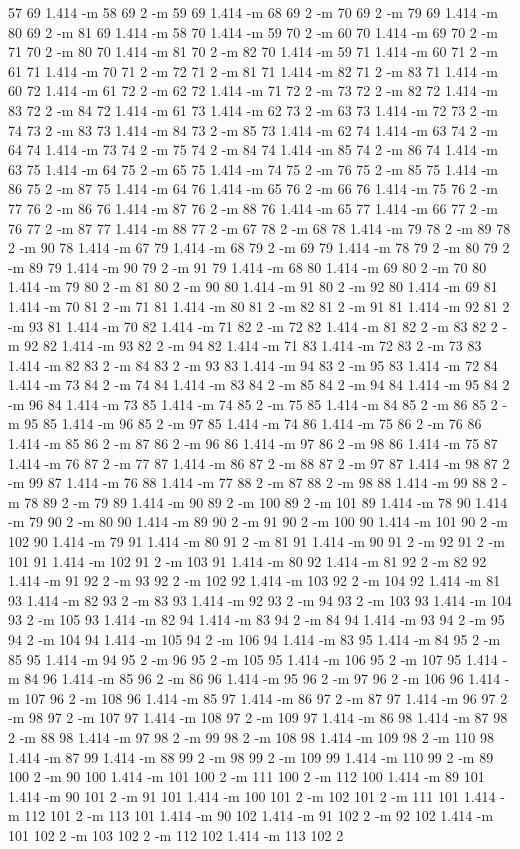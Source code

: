 \documentclass[12pt]{article}
\begin{document}
57 69 1.414 -m 58 69 2 -m 59 69 1.414 -m 68 69 2 -m 70 69 2 -m 79 69 1.414 -m 80 69 2 -m 81 69 1.414 -m 58 70 1.414 -m 59 70 2 -m 60 70 1.414 -m 69 70 2 -m 71 70 2 -m 80 70 1.414 -m 81 70 2 -m 82 70 1.414 -m 59 71 1.414 -m 60 71 2 -m 61 71 1.414 -m 70 71 2 -m 72 71 2 -m 81 71 1.414 -m 82 71 2 -m 83 71 1.414 -m 60 72 1.414 -m 61 72 2 -m 62 72 1.414 -m 71 72 2 -m 73 72 2 -m 82 72 1.414 -m 83 72 2 -m 84 72 1.414 -m 61 73 1.414 -m 62 73 2 -m 63 73 1.414 -m 72 73 2 -m 74 73 2 -m 83 73 1.414 -m 84 73 2 -m 85 73 1.414 -m 62 74 1.414 -m 63 74 2 -m 64 74 1.414 -m 73 74 2 -m 75 74 2 -m 84 74 1.414 -m 85 74 2 -m 86 74 1.414 -m 63 75 1.414 -m 64 75 2 -m 65 75 1.414 -m 74 75 2 -m 76 75 2 -m 85 75 1.414 -m 86 75 2 -m 87 75 1.414 -m 64 76 1.414 -m 65 76 2 -m 66 76 1.414 -m 75 76 2 -m 77 76 2 -m 86 76 1.414 -m 87 76 2 -m 88 76 1.414 -m 65 77 1.414 -m 66 77 2 -m 76 77 2 -m 87 77 1.414 -m 88 77 2 -m 67 78 2 -m 68 78 1.414 -m 79 78 2 -m 89 78 2 -m 90 78 1.414 -m 67 79 1.414 -m 68 79 2 -m 69 79 1.414 -m 78 79 2 -m 80 79 2 -m 89 79 1.414 -m 90 79 2 -m 91 79 1.414 -m 68 80 1.414 -m 69 80 2 -m 70 80 1.414 -m 79 80 2 -m 81 80 2 -m 90 80 1.414 -m 91 80 2 -m 92 80 1.414 -m 69 81 1.414 -m 70 81 2 -m 71 81 1.414 -m 80 81 2 -m 82 81 2 -m 91 81 1.414 -m 92 81 2 -m 93 81 1.414 -m 70 82 1.414 -m 71 82 2 -m 72 82 1.414 -m 81 82 2 -m 83 82 2 -m 92 82 1.414 -m 93 82 2 -m 94 82 1.414 -m 71 83 1.414 -m 72 83 2 -m 73 83 1.414 -m 82 83 2 -m 84 83 2 -m 93 83 1.414 -m 94 83 2 -m 95 83 1.414 -m 72 84 1.414 -m 73 84 2 -m 74 84 1.414 -m 83 84 2 -m 85 84 2 -m 94 84 1.414 -m 95 84 2 -m 96 84 1.414 -m 73 85 1.414 -m 74 85 2 -m 75 85 1.414 -m 84 85 2 -m 86 85 2 -m 95 85 1.414 -m 96 85 2 -m 97 85 1.414 -m 74 86 1.414 -m 75 86 2 -m 76 86 1.414 -m 85 86 2 -m 87 86 2 -m 96 86 1.414 -m 97 86 2 -m 98 86 1.414 -m 75 87 1.414 -m 76 87 2 -m 77 87 1.414 -m 86 87 2 -m 88 87 2 -m 97 87 1.414 -m 98 87 2 -m 99 87 1.414 -m 76 88 1.414 -m 77 88 2 -m 87 88 2 -m 98 88 1.414 -m 99 88 2 -m 78 89 2 -m 79 89 1.414 -m 90 89 2 -m 100 89 2 -m 101 89 1.414 -m 78 90 1.414 -m 79 90 2 -m 80 90 1.414 -m 89 90 2 -m 91 90 2 -m 100 90 1.414 -m 101 90 2 -m 102 90 1.414 -m 79 91 1.414 -m 80 91 2 -m 81 91 1.414 -m 90 91 2 -m 92 91 2 -m 101 91 1.414 -m 102 91 2 -m 103 91 1.414 -m 80 92 1.414 -m 81 92 2 -m 82 92 1.414 -m 91 92 2 -m 93 92 2 -m 102 92 1.414 -m 103 92 2 -m 104 92 1.414 -m 81 93 1.414 -m 82 93 2 -m 83 93 1.414 -m 92 93 2 -m 94 93 2 -m 103 93 1.414 -m 104 93 2 -m 105 93 1.414 -m 82 94 1.414 -m 83 94 2 -m 84 94 1.414 -m 93 94 2 -m 95 94 2 -m 104 94 1.414 -m 105 94 2 -m 106 94 1.414 -m 83 95 1.414 -m 84 95 2 -m 85 95 1.414 -m 94 95 2 -m 96 95 2 -m 105 95 1.414 -m 106 95 2 -m 107 95 1.414 -m 84 96 1.414 -m 85 96 2 -m 86 96 1.414 -m 95 96 2 -m 97 96 2 -m 106 96 1.414 -m 107 96 2 -m 108 96 1.414 -m 85 97 1.414 -m 86 97 2 -m 87 97 1.414 -m 96 97 2 -m 98 97 2 -m 107 97 1.414 -m 108 97 2 -m 109 97 1.414 -m 86 98 1.414 -m 87 98 2 -m 88 98 1.414 -m 97 98 2 -m 99 98 2 -m 108 98 1.414 -m 109 98 2 -m 110 98 1.414 -m 87 99 1.414 -m 88 99 2 -m 98 99 2 -m 109 99 1.414 -m 110 99 2 -m 89 100 2 -m 90 100 1.414 -m 101 100 2 -m 111 100 2 -m 112 100 1.414 -m 89 101 1.414 -m 90 101 2 -m 91 101 1.414 -m 100 101 2 -m 102 101 2 -m 111 101 1.414 -m 112 101 2 -m 113 101 1.414 -m 90 102 1.414 -m 91 102 2 -m 92 102 1.414 -m 101 102 2 -m 103 102 2 -m 112 102 1.414 -m 113 102 2 
\end{document}

